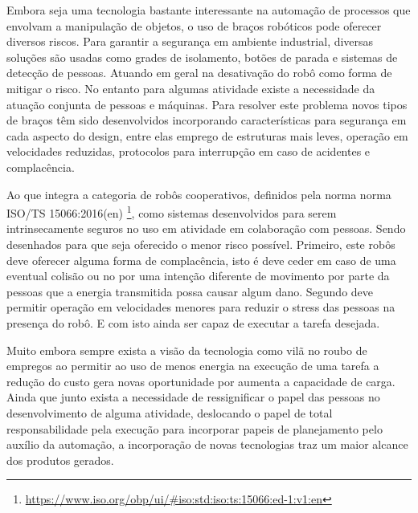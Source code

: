 Embora seja uma tecnologia bastante interessante na automação de processos que envolvam a manipulação de objetos, o uso de braços robóticos pode oferecer diversos riscos. Para garantir a segurança em ambiente industrial, diversas soluções são usadas como grades de isolamento, botões de parada e sistemas de detecção de pessoas. Atuando em geral na desativação do robô como forma de mitigar o risco. No entanto para algumas atividade existe a necessidade da atuação conjunta de pessoas e máquinas. Para resolver este problema novos tipos de braços têm sido desenvolvidos incorporando características para segurança em cada aspecto do design, entre elas emprego de estruturas mais leves, operação em velocidades reduzidas, protocolos para interrupção em caso de acidentes e complacência.%

Ao que integra a categoria de robôs cooperativos, definidos pela norma  norma ISO/TS 15066:2016(en) \footnote{\url{https://www.iso.org/obp/ui/#iso:std:iso:ts:15066:ed-1:v1:en}}, como sistemas desenvolvidos para serem intrinsecamente seguros no uso em atividade em colaboração com pessoas. Sendo desenhados para que seja oferecido o menor risco possível. Primeiro, este robôs deve oferecer alguma forma de complacência, isto é deve ceder em caso de uma eventual colisão ou no por uma intenção diferente de movimento por parte da pessoas que a energia transmitida possa causar algum dano. Segundo deve permitir operação em velocidades menores para reduzir o stress das pessoas na presença do robô. E com isto ainda ser capaz de executar a tarefa desejada.

Muito embora sempre exista a visão da tecnologia como vilã no roubo de empregos ao permitir ao uso de menos energia na execução de uma tarefa a redução do custo gera novas oportunidade por aumenta a capacidade de carga. Ainda que junto exista a necessidade de ressignificar o papel das pessoas no desenvolvimento de alguma atividade, deslocando o papel de total responsabilidade pela execução para incorporar papeis de planejamento pelo auxílio da automação, a incorporação de novas tecnologias traz um maior alcance dos produtos gerados.




